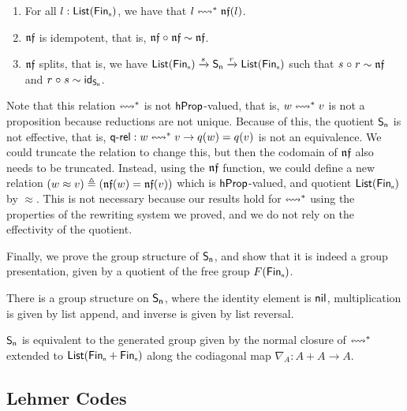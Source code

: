\begin{proposition}
  \leavevmode
  \begin{enumerate}
    \item For all $l : \List[\Fin[n]]$, we have that $l \cox* \normf(l)$.
    \item $\operatorname{\mathsf{\mathfrak{nf}}}$ is idempotent, that is, $\operatorname{\mathsf{\mathfrak{nf}}} \mathrel{\circ} \operatorname{\mathsf{\mathfrak{nf}}} \mathrel{\sim} \operatorname{\mathsf{\mathfrak{nf}}}$.
    \item $\operatorname{\mathsf{\mathfrak{nf}}}$ splits, that is, we have ${\List[\Fin[n]]} \xrightarrow{s} \Sn[n] \xrightarrow{r} {\List[\Fin[n]]}$
          such that $s \mathrel{\circ} r \mathrel{\sim} \operatorname{\mathsf{\mathfrak{nf}}}$ and $r \comp s \htpy \idfunc_{\Sn[n]}$.
  \end{enumerate}
\end{proposition}

Note that this relation $\cox*$ is not $\mathsf{hProp}$-valued, that is, $w \cox* v$ is not a proposition because reductions are
not unique. Because of this, the quotient $\Sn$ is not effective, that is, $\quotrel : w \cox* v \to q(w) \id q(v)$ is
not an equivalence. We could truncate the relation to change this, but then the codomain of $\operatorname{\mathsf{\mathfrak{nf}}}$ also needs to be
truncated. Instead, using the $\operatorname{\mathsf{\mathfrak{nf}}}$ function, we could define a new relation
$(w \approx v) \defeq (\normf(w) \id \normf(v))$ which is $\mathsf{hProp}$-valued, and quotient $\List[\Fin[n]]$ by $\approx$.
This is not necessary because our results hold for $\cox*$ using the properties of the rewriting system we proved, and
we do not rely on the effectivity of the quotient.

Finally, we prove the group structure of $\Sn$, and show that it is indeed a group presentation, given by a quotient of
the free group $F(\Fin[n])$.

\begin{proposition}
  There is a group structure on $\Sn$, where the identity element is $\operatorname{\mathsf{nil}}$, multiplication is given by list append, and
  inverse is given by list reversal.
\end{proposition}

\begin{proposition}
  $\Sn$ is equivalent to the generated group given by the normal closure of $\cox*$ extended to
  $\List(\Fin[n] + \Fin[n])$ along the codiagonal map $\nabla_{A} : A + A \to A$.
\end{proposition}

\subsection{Lehmer Codes}~\label{subsec:lehmer}


